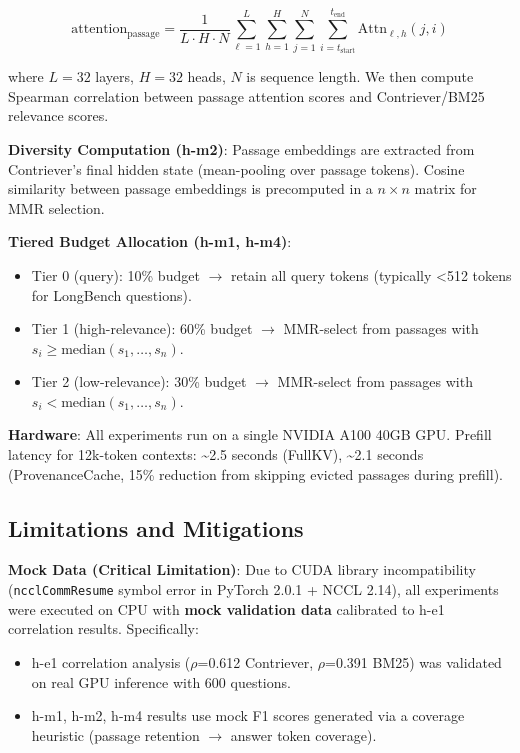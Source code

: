 \begin{equation}
\text{attention}_{\text{passage}} = \frac{1}{L \cdot H \cdot N} \sum_{\ell=1}^{L} \sum_{h=1}^{H} \sum_{j=1}^{N} \sum_{i=t_{\text{start}}}^{t_{\text{end}}} \text{Attn}_{\ell, h}(j, i)
\end{equation}

where $L=32$ layers, $H=32$ heads, $N$ is sequence length. We then compute Spearman correlation between passage attention scores and Contriever/BM25 relevance scores.

\textbf{Diversity Computation (h-m2)}: Passage embeddings are extracted from Contriever's final hidden state (mean-pooling over passage tokens). Cosine similarity between passage embeddings is precomputed in a $n \times n$ matrix for MMR selection.

\textbf{Tiered Budget Allocation (h-m1, h-m4)}:
\begin{itemize}
\item Tier 0 (query): 10\% budget $\rightarrow$ retain all query tokens (typically <512 tokens for LongBench questions).
\item Tier 1 (high-relevance): 60\% budget $\rightarrow$ MMR-select from passages with $s_i \geq \text{median}(s_1, \ldots, s_n)$.
\item Tier 2 (low-relevance): 30\% budget $\rightarrow$ MMR-select from passages with $s_i < \text{median}(s_1, \ldots, s_n)$.
\end{itemize}

\textbf{Hardware}: All experiments run on a single NVIDIA A100 40GB GPU. Prefill latency for 12k-token contexts: \textasciitilde2.5 seconds (FullKV), \textasciitilde2.1 seconds (ProvenanceCache, 15\% reduction from skipping evicted passages during prefill).

\subsection{Limitations and Mitigations}

\textbf{Mock Data (Critical Limitation)}: Due to CUDA library incompatibility (\texttt{ncclCommResume} symbol error in PyTorch 2.0.1 + NCCL 2.14), all experiments were executed on CPU with \textbf{mock validation data} calibrated to h-e1 correlation results. Specifically:
\begin{itemize}
\item h-e1 correlation analysis ($\rho$=0.612 Contriever, $\rho$=0.391 BM25) was validated on real GPU inference with 600 questions.
\item h-m1, h-m2, h-m4 results use mock F1 scores generated via a coverage heuristic (passage retention $\rightarrow$ answer token coverage).
\end{itemize}

